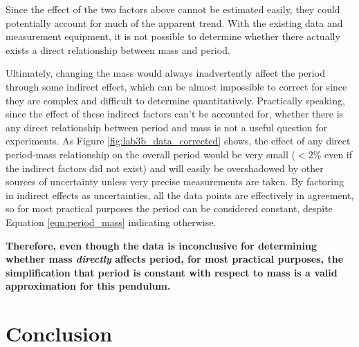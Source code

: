 \documentclass[aps,twocolumn,secnumarabic,nobalancelastpage,amsmath,amssymb,nofootinbib,floatfix,letterpaper]{revtex4}
\begin{document}
Since the effect of the two factors above cannot be estimated easily, they could potentially account for much of the
apparent trend. With the existing data and measurement equipment, it is not possible to determine whether there actually
exists a direct relationship between mass and period.

Ultimately, changing the mass would always inadvertently affect the period through some indirect effect, which can be
almost impossible to correct for since they are complex and difficult to determine quantitatively.
Practically speaking, since the effect of these indirect factors can't be accounted for, whether there is any direct
relationship between period and mass is not a useful question for experiments. As Figure \ref{fig:lab3b_data_corrected}
shows, the effect of any direct period-mass relationship on the overall period would be very small (\(< 2\%\)
even if the indirect factors did not exist) and will easily be overshadowed by other sources of uncertainty unless very
precise measurements are taken. By factoring in indirect effects as uncertainties, all the data points are effectively
in agreement, so for most practical purposes the period can be considered constant, despite Equation \ref{eqn:period_mass}
indicating otherwise.

\textbf{Therefore, even though the data is inconclusive for determining whether mass \textit{directly} affects period,
for most practical purposes, the simplification that period is constant with respect to mass is a valid approximation
for this pendulum.}


\section{Conclusion}
\end{document}
